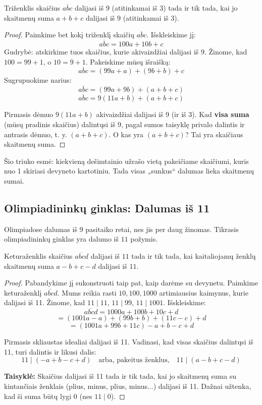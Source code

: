 \documentclass[11pt,a4paper]{scrartcl}
\begin{document}
\begin{proposition}
Triženklis skaičius $\overline{abc}$ dalijasi iš $9$ (atitinkamai iš $3$) tada ir tik tada, kai jo skaitmenų suma $a+b+c$ dalijasi iš $9$ (atitinkamai iš $3$).
\end{proposition}

\begin{proof}
Paimkime bet kokį triženklį skaičių $\overline{abc}$. Išskleiskime jį:
\[ \overline{abc} = 100a + 10b + c \]
Gudrybė: atskirkime tuos skaičius, kurie akivaizdžiai dalijasi iš 9. Žinome, kad $100 = 99 + 1$, o $10 = 9 + 1$. Pakeiskime mūsų išraišką:
\[ \overline{abc} = (99a + a) + (9b + b) + c \]
Sugrupuokime narius:
\[ \overline{abc} = (99a + 9b) + (a + b + c) \]
\[ \overline{abc} = 9(11a + b) + (a + b + c) \]

Pirmasis dėmuo $9(11a + b)$ akivaizdžiai dalijasi iš 9 (ir iš 3). Kad \textbf{visa suma} (mūsų pradinis skaičius) dalintųsi iš 9, pagal sumos taisyklę privalo dalintis ir antrasis dėmuo, t. y. $(a + b + c)$. O kas yra $(a+b+c)$? Tai yra skaičiaus skaitmenų suma.
\end{proof}

\begin{remark*}
Šio triuko esmė: kiekvieną dešimtainio užrašo vietą pakeičiame skaičiumi, kuris nuo 1 skiriasi devyneto kartotiniu. Tada visas „sunkus“ dalumas lieka skaitmenų sumai.
\end{remark*}

\subsection*{Olimpiadininkų ginklas: Dalumas iš 11}

Olimpiadose dalumas iš 9 pasitaiko retai, nes jis per daug žinomas. Tikrasis olimpiadininkų ginklas yra dalumo iš $11$ požymis. 

\begin{proposition}
Keturaženklis skaičius $\overline{abcd}$ dalijasi iš $11$ tada ir tik tada, kai kaitaliojamų ženklų skaitmenų suma $a-b+c-d$ dalijasi iš $11$.
\end{proposition}

\begin{proof}
Pabandykime jį sukonstruoti taip pat, kaip darėme su devynetu. Paimkime keturaženklį $\overline{abcd}$. 
Mums reikia rasti $10, 100, 1000$ artimiausius kaimynus, kurie dalijasi iš 11.
Žinome, kad $11 \mid 11$, $11 \mid 99$, $11 \mid 1001$.
Išskleiskime:
\[ \overline{abcd} = 1000a + 100b + 10c + d \]
\[ = (1001a - a) + (99b + b) + (11c - c) + d \]
\[ = (1001a + 99b + 11c) - a + b - c + d \]

Pirmasis skliaustas idealiai dalijasi iš 11. Vadinasi, kad visas skaičius dalintųsi iš 11, turi dalintis ir likusi dalis:
\[ 11 \mid (-a + b - c + d) \quad \text{arba, pakeitus ženklus,} \quad 11 \mid (a - b + c - d) \]

\textbf{Taisyklė:} Skaičius dalijasi iš 11 tada ir tik tada, kai jo skaitmenų suma su kintančiais ženklais (plius, minus, plius, minus...) dalijasi iš 11. Dažnai užtenka, kad ši suma būtų lygi $0$ (nes $11 \mid 0$).
\end{proof}
\end{document}
